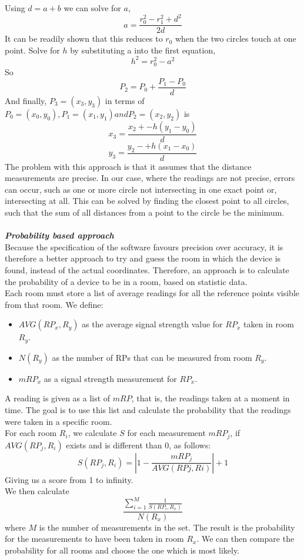 Using $d = a + b$ we can solve for $a$,
$$a = \frac{r_0^2 - r_1^2 +d^2}{2d}$$
It can be readily shown that this reduces to $r_0$ when the two circles touch at one point.
Solve for $h$ by substituting a into the first equation, $$h^2 = r_0^2 - a^2$$
So $$P_2 = P_0 + \frac{P_1 - P_0}{d}$$
And finally, $P_3 = (x_3, y_3)$ in terms of $P_0 = (x_0, y_0),  P_1 = (x_1, y_1) and P_2 = (x_2, y_2)$ is $$x_3 =\frac{x_2 + -h(y_1 - y_0)}{d}$$ $$y_3 =\frac{y_2 - +h(x_1 - x_0)}{d}$$
The problem with this approach is that it assumes that the distance measurements are precise. In our case, where the readings are not precise, errors can occur, such as one or more circle not intersecting in one exact point or, intersecting at all.
This can be solved by finding the closest point to all circles, such that the sum of all distances from a point to the circle be the minimum.\\
\\
\textit{\textbf{Probability based approach}}
\\
Because the specification of the software favours precision over accuracy, it is therefore a better approach to try and guess the room in which the device is found, instead of the actual coordinates. Therefore, an approach is to calculate the probability of a device to be in a room, based on statistic data.\\
Each room must store a list of average readings for all the reference points visible from that room. 
We define:\\
\begin{itemize}
\item $AVG(RP_x, R_y)$ as the average signal strength value for $RP_x$ taken in room $R_y$.
\item $N(R_y)$ as the number of RPs that can be measured from room $R_y$.
\item $mRP_x$ as a signal strength measurement for $RP_x$.
\end{itemize} 

A reading is given as a list of $mRP$, that is, the readings taken at a moment in time. The goal is to use this list and calculate the probability that the readings were taken in a specific room.\\
For each room $R_i$, we calculate $S$ for each measurement $mRP_j$, if $AVG(RP_j, R_i)$ exists and is different than 0, as follows:
$$S(RP_j, R_i) = | 1 - \frac{mRP_j}{AVG(RPj, Ri)}|+1$$
Giving us a score from 1 to infinity.\\
We then calculate 
$$\frac{\displaystyle\sum_{i=1}^{M} \frac{1}{S(RP_i, R_x)}}{N(R_x)}$$
where $M$ is the number of measurements in the set.
The result is the probability for the measurements to have been taken in room $R_x$.
We can then compare the probability for all rooms and choose the one which is most likely.




